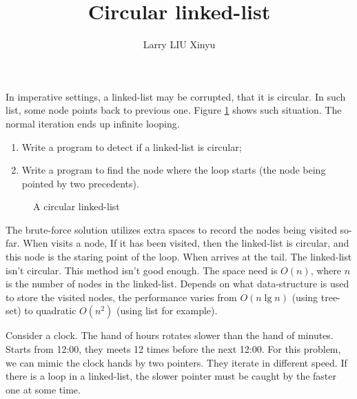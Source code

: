 \documentclass{article}
\begin{document}
\title{Circular linked-list}
\author{Larry LIU Xinyu}
\maketitle

In imperative settings, a linked-list may be corrupted, that it is circular. In such list, some node
points back to previous one. Figure \ref{fig:circular-list} shows such situation.
The normal iteration ends up infinite looping.
  \begin{enumerate}
    \item Write a program to detect if a linked-list is circular;
    \item Write a program to find the node where the loop starts (the node being pointed by two precedents).
  \end{enumerate}

\begin{figure}[htdp]
\centering
{}
\caption{A circular linked-list}
\label{fig:circular-list}
\end{figure}

The brute-force solution utilizes extra spaces to record the nodes being visited so-far.
When visits a node, If it has been visited, then the linked-list is circular, and this
node is the staring point of the loop. When arrives at the tail. The linked-list isn't
circular. This method isn't good enough. The space need is $O(n)$, where $n$ is the
number of nodes in the linked-list. Depends on what data-structure is used to store
the visited nodes, the performance varies from $O(n \lg n)$ (using tree-set) to quadratic $O(n^2)$
(using list for example).

Consider a clock. The hand of hours rotates slower than the hand of minutes. Starts
from 12:00, they meets 12 times before the next 12:00. For this problem,
we can mimic the clock hands by two pointers. They iterate in different speed.
If there is a loop in a linked-list, the slower pointer must be caught by the faster
one at some time.
\end{document}
